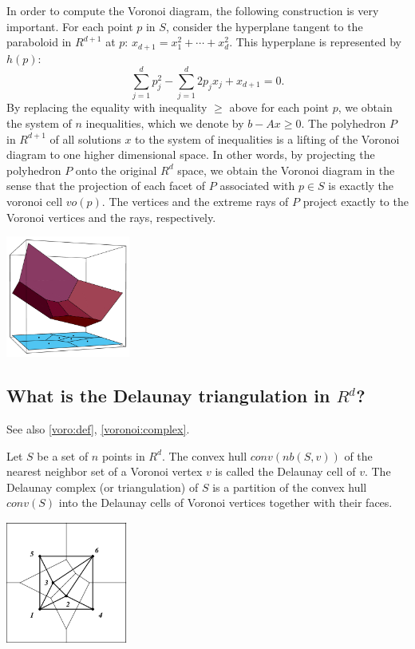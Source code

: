 \documentclass[a4paper,12pt]{article}
\begin{document}
In order to compute the Voronoi diagram, the following construction
is very important.  For each point $p$ in $S$, consider
the hyperplane tangent to the paraboloid in $R^{d+1}$ at $p$: 
$x_{d+1} = x_1^2 + \cdots + x_d^2$.  This hyperplane is 
represented by $h(p)$: 
\[
\sum_{j=1}^d p_j^2 - \sum_{j=1}^d 2 p_j x_j + x_{d+1} = 0.
\]
By replacing the equality with inequality $\ge$ above for each point $p$,
we obtain the system of $n$ inequalities, which we denote by  
$b - A x \ge 0$.  The polyhedron $P$ in $R^{d+1}$ of all solutions
$x$ to the system of inequalities is a lifting of the Voronoi diagram
to one higher dimensional space.  In other words, by projecting
the polyhedron $P$ onto the original $R^d$ space, we obtain
the Voronoi diagram in the sense that the projection of each facet of $P$
associated with $p \in S$ is exactly the voronoi cell $vo(p)$.
The vertices and the extreme rays of $P$ project exactly to
the Voronoi vertices and the rays, respectively.

\bigskip
\begin{center}
\includegraphics[height=40mm]{vtest_fig_vo3d}
\end{center}

\subsection{What is the Delaunay triangulation in $R^d$? }
\label{voro:dela_def}

See also \ref{voro:def}, \ref{voronoi:complex}.

Let $S$ be a set of $n$ points in $R^d$. 
The convex hull $conv(nb(S, v))$ of the nearest neighbor set of a
Voronoi vertex $v$ is called the Delaunay cell of $v$. 
The Delaunay complex (or triangulation) of $S$
is a partition of the convex hull $conv(S)$ into 
the Delaunay cells of Voronoi vertices together with
their faces.

\bigskip
\begin{center}
\includegraphics[height=40mm]{vtest_draw_vode}
\end{center}
\end{document}
